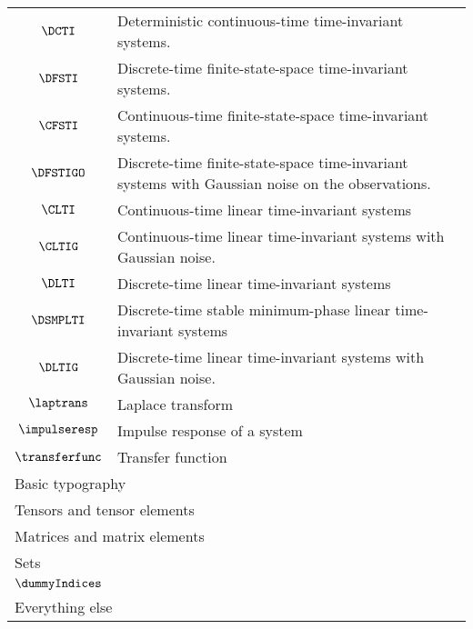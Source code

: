 \begin{longtable}{cl}
 $\DCTI$ &  Deterministic continuous-time time-invariant systems.\\ 
 $\DFSTI$ &  Discrete-time finite-state-space time-invariant systems.\\ 
 $\CFSTI$ &  Continuous-time finite-state-space time-invariant systems.\\ 
 $\DFSTIGO$ &  Discrete-time finite-state-space time-invariant systems with Gaussian noise on the observations.\\ 
 $\CLTI$ &  Continuous-time linear time-invariant systems\\ 
 $\CLTIG$ &  Continuous-time linear time-invariant systems with Gaussian noise.\\ 
 $\DLTI$ &  Discrete-time linear time-invariant systems\\ 
 $\DSMPLTI$ &  Discrete-time stable minimum-phase linear time-invariant systems\\ 
 $\DLTIG$ &  Discrete-time linear time-invariant systems with Gaussian noise.\\ 
 $\laptrans$ &  Laplace transform\\ 
 $\impulseresp$ &  Impulse response of a system\\ 
 $\transferfunc$ &  Transfer function\\ 
 \multicolumn{2}{l}{Basic typography}\\ 
 \hline
\hline
\multicolumn{2}{l}{Tensors and tensor elements}\\ 
 \hline
\multicolumn{2}{l}{Matrices and matrix elements}\\ 
 \hline
\multicolumn{2}{l}{Sets}\\ 
 \hline
$\dummyIndices$ & \\ 
 \multicolumn{2}{l}{Everything else}\\ 
 \hline
\end{longtable}
